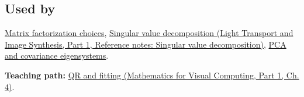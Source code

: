 \subsection{Used by}\label{appendix-c3421e6b4f2c-used-by}

\hypertarget{appendix-c3421e6b4f2c-used-by}{}

\hyperref[appendix-221a483bec2d]{Matrix factorization choices}, \href{../04-Light-Transport-and-Image-Synthesis-P01/main.pdf\#nameddest=appendix-1fad5e7f36fa}{Singular value decomposition (Light Transport and Image Synthesis, Part 1, Reference notes: Singular value decomposition)}, \hyperref[appendix-ad175ef3c5bf]{PCA and covariance eigensystems}.

\textbf{Teaching path:} \href{../02-Mathematics-for-Visual-Computing-P01/main.pdf\#nameddest=01-foundations-i-ch020-structure-makes-a-decomposition-a-better-tool-than-generic-elimination}{QR and fitting (Mathematics for Visual Computing, Part 1, Ch. 4)}.
